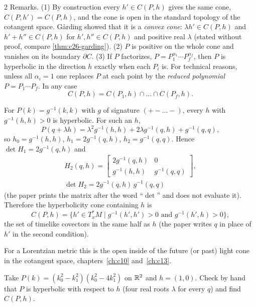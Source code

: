 \begin{paracol}{2}
Remarks. (1) By construction every $h'\in C(P,h)$ gives the same cone, $C(P,h')=C(P,h)$, and the cone is open in the standard topology of the cotangent space. G{\aa}rding showed that it is a \emph{convex cone}: $\lambda h'\in C(P,h)$ and $h'+h''\in C(P,h)$ for $h',h''\in C(P,h)$ and positive real $\lambda$ (stated without proof, compare \cref{thm:c26-garding}). (2) $P$ is positive on the whole cone and vanishes on its boundary $\partial C$. (3) If $P$ factorizes, $P=P_1^{\alpha_1}\cdots P_f^{\alpha_f}$, then $P$ is hyperbolic in the direction $h$ exactly when each $P_i$ is. For technical reasons, unless all $\alpha_i=1$ one replaces $P$ at each point by the \emph{reduced polynomial} $P=P_1\cdots P_f$. In any case
\[
  C(P,h)=C(P_1,h)\cap\dots\cap C(P_f,h).
\]

\begin{example}\label{ex:c29-lorcone}
For $P(k)=g^{-1}(k,k)$ with $g$ of signature $(+-\dots-)$, every $h$ with $g^{-1}(h,h)>0$ is hyperbolic. For such an $h$,
\[
  P(q+\lambda h)=\lambda^2g^{-1}(h,h)+2\lambda g^{-1}(q,h)+g^{-1}(q,q),
\]
so $h_0=g^{-1}(h,h)$, $h_1=2g^{-1}(q,h)$, $h_2=g^{-1}(q,q)$. Hence $\det H_1=2g^{-1}(q,h)$ and
\begin{gather*}
  H_2(q,h)=\begin{bmatrix}2g^{-1}(q,h)&0\\g^{-1}(h,h)&g^{-1}(q,q)\end{bmatrix},\\ \det H_2=2g^{-1}(q,h)\,g^{-1}(q,q)
\end{gather*}
(the paper prints the matrix after the word ``$\det$'' and does not evaluate it). Therefore the hyperbolicity cone containing $h$ is
\[
  C(P,h)=\{h'\in T^*_xM\mid g^{-1}(h',h')>0\text{ and }g^{-1}(h',h)>0\},
\]
the set of timelike covectors in the same half as $h$ (the paper writes $q$ in place of $h'$ in the second condition).
\end{example}
\begin{recall}
For a Lorentzian metric this is the open inside of the future (or past) light cone in the cotangent space, chapters~\ref{ch:c10} and~\ref{ch:c13}.
\end{recall}

\begin{exercise}\label{ex:c29-quartic}
Take $P(k)=(k_0^2-k_1^2)(k_0^2-4k_1^2)$ on $\mathbb{R}^2$ and $h=(1,0)$. Check by hand that $P$ is hyperbolic with respect to $h$ (four real roots $\lambda$ for every $q$) and find $C(P,h)$.
\end{exercise}


\end{paracol}

